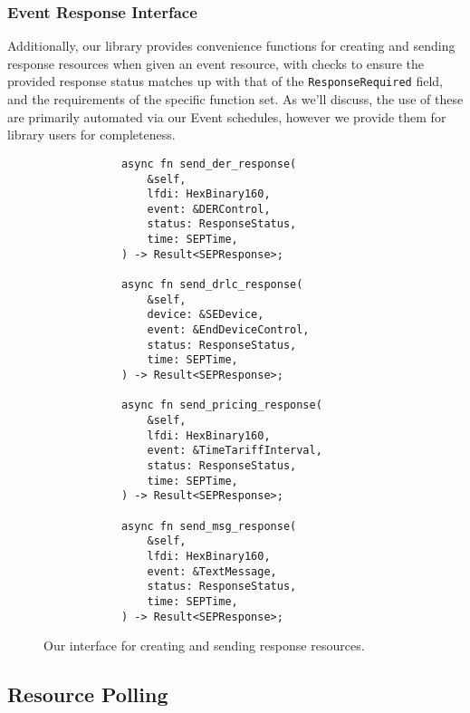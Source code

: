 \subsubsection{Event Response Interface}

Additionally, our library provides convenience functions for creating and sending response resources when given an event resource, with checks to ensure the provided response status matches up with that of the \texttt{ResponseRequired} field, and the requirements of the specific function set.  As we'll discuss, the use of these are primarily automated via our Event schedules, however we provide them for library users for completeness.


\begin{figure}[h]
    \begin{center}
        \begin{lstlisting}
            async fn send_der_response(
                &self,
                lfdi: HexBinary160,
                event: &DERControl,
                status: ResponseStatus,
                time: SEPTime,
            ) -> Result<SEPResponse>;

            async fn send_drlc_response(
                &self,
                device: &SEDevice,
                event: &EndDeviceControl,
                status: ResponseStatus,
                time: SEPTime,
            ) -> Result<SEPResponse>;

            async fn send_pricing_response(
                &self,
                lfdi: HexBinary160,
                event: &TimeTariffInterval,
                status: ResponseStatus,
                time: SEPTime,
            ) -> Result<SEPResponse>;

            async fn send_msg_response(
                &self,
                lfdi: HexBinary160,
                event: &TextMessage,
                status: ResponseStatus,
                time: SEPTime,
            ) -> Result<SEPResponse>;
        \end{lstlisting}
        \label{fig:sendresponsefunc}
        \vspace{-10pt}
        \caption{Our interface for creating and sending response resources.}
    \end{center}
\end{figure}

\subsection{Resource Polling}

